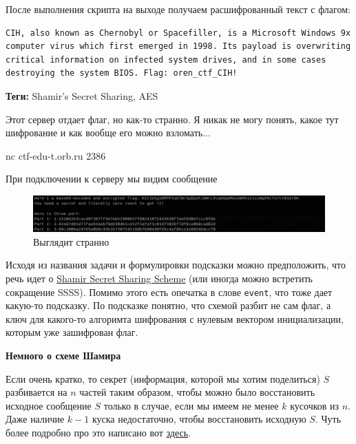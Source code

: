 \documentclass[idxtotoc,hyperref,openany,oneside]{files/crypto} %
\begin{document}
После выполнения скрипта на выходе получаем расшифрованный текст с флагом:
\begin{verbatim}
CIH, also known as Chernobyl or Spacefiller, is a Microsoft Windows 9x
computer virus which first emerged in 1998. Its payload is overwriting
critical information on infected system drives, and in some cases
destroying the system BIOS. Flag: oren_ctf_CIH!
\end{verbatim}



\textbf{Теги:} Shamir's Secret Sharing, AES\vspace{\baselineskip}

\begin{tcolorbox}
Этот сервер отдает флаг, но как-то странно. Я никак не могу понять, какое тут шифрование и как вообще его можно взломать...

nc ctf-edu-t.orb.ru 2386
\end{tcolorbox}

При подключении к серверу мы видим сообщение
\begin{figure}[H]
\begin{center}
\includegraphics[width=1.0\linewidth]{files/shamir_aes}
\end{center}
\caption{Выглядит странно}
\label{fig:chinese}
\end{figure}
Исходя из названия задачи и формулировки подсказки можно предположить, что речь идет о \href{https://en.wikipedia.org/wiki/Shamir\%27s_Secret_Sharing}{Shamir Secret Sharing Scheme} (или иногда можно встретить сокращение SSSS). Помимо этого есть опечатка в слове \verb|event|, что тоже дает какую-то подсказку. По подсказке понятно, что схемой разбит не сам флаг, а ключ для какого-то алгоримта шифрования с нулевым вектором инициализации, которым уже зашифрован флаг.

\textbf{Немного о схеме Шамира}

Если очень кратко, то секрет (информация, которой мы хотим поделиться) $S$ разбивается на $n$ частей таким образом, чтобы можно было восстановить исходное сообщение $S$ только в случае, если мы имеем не менее $k$ кусочков из $n$. Даже наличие $k-1$ куска недостаточно, чтобы восстановить исходную $S$. Чуть более подробно про это написано вот \href{https://habr.com/ru/post/431392/}{здесь}.
\end{document}
